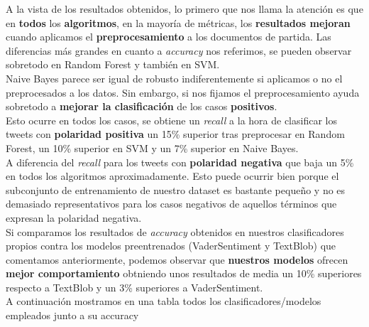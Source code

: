 \documentclass[a4paper,12pt]{report}
\begin{document}
A la vista de los resultados obtenidos, lo primero que nos llama la atención es que en \textbf{todos} los \textbf{algoritmos}, en la mayoría de métricas, los \textbf{resultados mejoran} cuando aplicamos el \textbf{preprocesamiento} a los documentos de partida. Las diferencias más grandes en cuanto a \textit{accuracy} nos referimos, se pueden observar sobretodo en Random Forest y también en SVM. 
\vspace{2mm}\\
Naive Bayes parece ser igual de robusto indiferentemente si aplicamos o no el preprocesados a los datos. Sin embargo, si nos fijamos el preprocesamiento ayuda sobretodo a \textbf{mejorar la clasificación} de los casos \textbf{positivos}. 
\vspace{2mm}\\
Esto ocurre en todos los casos, se obtiene un \textit{recall} a la hora de clasificar los tweets con \textbf{polaridad positiva} un 15\% superior tras preprocesar en Random Forest, un 10\% superior en SVM y un 7\% superior en Naive Bayes.
\vspace{2mm}\\
A diferencia del \textit{recall} para los tweets con \textbf{polaridad negativa} que baja un 5\% en todos los algoritmos aproximadamente. Esto puede ocurrir bien porque el subconjunto de entrenamiento de nuestro dataset es bastante pequeño y no es demasiado representativos para los casos negativos de aquellos términos que expresan la polaridad negativa.
\vspace{4mm}\\
Si comparamos los resultados de \textit{accuracy} obtenidos en nuestros clasificadores propios contra los modelos preentrenados (VaderSentiment y TextBlob) que comentamos anteriormente, podemos observar que \textbf{nuestros modelos} ofrecen \textbf{mejor comportamiento} obtniendo unos resultados de media un 10\% superiores respecto a TextBlob y un 3\% superiores a VaderSentiment.
\vspace{2mm}\\
A continuación mostramos en una tabla todos los clasificadores/modelos empleados junto a su accuracy

\begin{table}[htbp!]
\begin{center}
\end{center}
\end{table}
\end{document}
